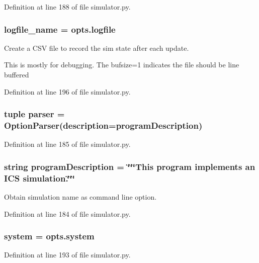 Definition at line 188 of file simulator.\+py.

\subsubsection[{logfile\+\_\+name}]{\setlength{\rightskip}{0pt plus 5cm}logfile\+\_\+name = opts.\+logfile}\label{namespacesimulator_ae1656cbf537a2e164294e638539f301f}


Create a C\+S\+V file to record the sim state after each update. 

This is mostly for debugging. The bufsize=1 indicates the file should be line buffered 

Definition at line 196 of file simulator.\+py.

\subsubsection[{parser}]{\setlength{\rightskip}{0pt plus 5cm}tuple parser = Option\+Parser(description={\bf program\+Description})}\label{namespacesimulator_a8842070e9da559035fb0c7cd5f8b3c6e}


Definition at line 185 of file simulator.\+py.

\subsubsection[{program\+Description}]{\setlength{\rightskip}{0pt plus 5cm}string program\+Description = \char`\"{}\char`\"{}\char`\"{}This program implements an I\+C\+S simulation.\char`\"{}\char`\"{}\char`\"{}}\label{namespacesimulator_a638ba7c1243233951e914e5623d8b6b3}


Obtain simulation name as command line option. 



Definition at line 184 of file simulator.\+py.

\subsubsection[{system}]{\setlength{\rightskip}{0pt plus 5cm}system = opts.\+system}\label{namespacesimulator_ac4ca86dead4518ac4fd6e30172db3d9e}


Definition at line 193 of file simulator.\+py.

